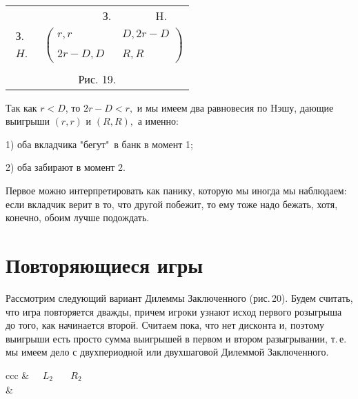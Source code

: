 \begin{center}
\begin{tabular}{ccccc}
&&&\quad З.&\,\,\,H.\\
$\begin{array}{c}
З.\\
\\
H. \end{array}$&
\multicolumn{4}{c}{$(\begin{array}{ccc}
r,r&&D,2r-D\\
\\
2r-D,D&& R,R \end{array})$}\\
\multicolumn{5}{c}{}\\
\multicolumn{5}{c}{Рис. 19.}\\
\end{tabular}
\end{center}

Так как $r<D$, то $2r-D<r,$ и мы имеем два равновесия по Hэшу, дающие выигрыши
$(r,r)$ и $(R,R),$ а именно:

1) оба вкладчика "бегут"\, в банк в момент 1;

2) оба забирают в момент 2.

Первое можно интерпретировать как панику, которую мы иногда мы наблюдаем:
если вкладчик верит в то, что другой побежит, то ему тоже надо бежать, хотя,
конечно, обоим лучше подождать.


\section{Повторяющиеся игры}

Рассмотрим следующий вариант Дилеммы Заключенного (рис.\,20).
Будем считать, что игра повторяется дважды, причем игроки узнают
исход первого розыгрыша до того, как начинается второй. Считаем пока,
что нет дисконта и, поэтому выигрыши есть просто сумма выигрышей в
первом и втором разыгрывании, т.\,е. мы имеем дело с двухпериодной
или двухшаговой Дилеммой Заключенного.

\begin{center}
\begin{tabular}{ccc}
&$\begin{array}{cc}\quad L_2&\quad R_2\end{array}$ \\
&
\\
\\
\\
\end{tabular}
\end{center}

